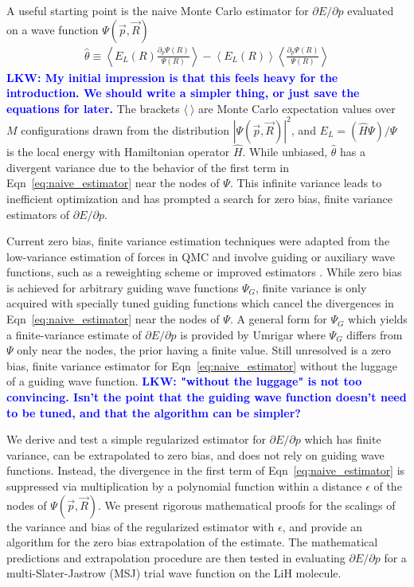 \documentclass[twocolumn]{revtex4-1}
\newcommand{\lucas}[1]{\textbf{\textcolor{blue}{LKW: #1}}}
\begin{document}
A useful starting point is the naive Monte Carlo estimator for $\partial E/\partial p$ evaluated on a wave function $\Psi(\vec{p}, \vec{R})$ 
\begin{equation}
\begin{split}
\hat{\theta} \equiv \left\langle E_L(R) \frac{\partial_p \Psi(R)}{\Psi(R)} \right\rangle - \left\langle E_L(R) \right \rangle \left \langle \frac{\partial_p \Psi(R)}{\Psi(R)}\right\rangle 
\end{split}
\label{eq:naive_estimator}
\end{equation}
\lucas{My initial impression is that this feels heavy for the introduction. We should write a simpler thing, or just save the equations for later.}
The brackets $\langle \ \rangle$ are Monte Carlo expectation values over $M$ configurations drawn from the distribution $|\Psi(\vec{p}, \vec{R})|^2$, and $E_L = (\hat{H}\Psi)/\Psi$ is the local energy with Hamiltonian operator $\hat{H}$.
While unbiased, $\hat{\theta}$ has a divergent variance \cite{Avella, doi:10.1063/1.4933112} due to the behavior of the first term in Eqn~\ref{eq:naive_estimator} near the nodes of $\Psi$.
This infinite variance leads to inefficient optimization and has prompted a search for zero bias, finite variance estimators of $\partial E/\partial p$.

Current zero bias, finite variance estimation techniques were adapted from the low-variance estimation of forces in QMC \cite{doi:10.1063/1.462059, doi:10.1063/1.3516208, Phys2016} and involve guiding or auxiliary wave functions, such as a reweighting scheme \cite{Avella, Attaccalite2008, Zen2013} or improved estimators \cite{Assaraf1999, doi:10.1063/1.1286598, Assaraf2003}.
While zero bias is achieved for arbitrary guiding wave functions $\Psi_G$, finite variance is only acquired with specially tuned guiding functions which cancel the divergences in Eqn~\ref{eq:naive_estimator} near the nodes of $\Psi$.
A general form for $\Psi_G$ which yields a finite-variance estimate of $\partial E/\partial p$ is provided by Umrigar \cite{doi:10.1063/1.4933112} where $\Psi_G$ differs from $\Psi$ only near the nodes, the prior having a finite value.
Still unresolved is a zero bias, finite variance estimator for Eqn~\ref{eq:naive_estimator} without the luggage of a guiding wave function. 
\lucas{"without the luggage" is not too convincing. Isn't the point that the guiding wave function doesn't need to be tuned, and that the algorithm can be simpler?}

We derive and test a simple regularized estimator for $\partial E/\partial p$ which has finite variance, can be extrapolated to zero bias, and does not rely on guiding wave functions.
Instead, the divergence in the first term of Eqn~\ref{eq:naive_estimator} is suppressed via multiplication by a polynomial function within a distance $\epsilon$ of the nodes of $\Psi(\vec{p}, \vec{R})$. 
We present rigorous mathematical proofs for the scalings of the variance and bias of the regularized estimator with $\epsilon$, and provide an algorithm for the zero bias extrapolation of the estimate.
The mathematical predictions and extrapolation procedure are then tested in evaluating $\partial E/\partial p$ for a multi-Slater-Jastrow (MSJ) trial wave function on the LiH molecule.
\end{document}
